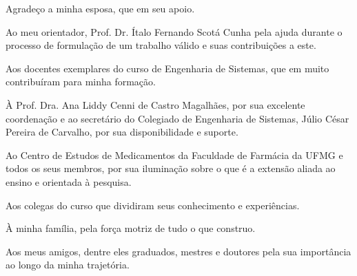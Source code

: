 
\begin{agradecimentos}


Agradeço a minha esposa, que em seu apoio.

Ao meu orientador, Prof. Dr. Ítalo Fernando Scotá Cunha pela ajuda durante o processo de formulação de um trabalho válido e suas contribuições a este.

Aos docentes exemplares do curso de Engenharia de Sistemas, que em muito contribuíram para minha formação.

À Prof. Dra. Ana Liddy Cenni de Castro Magalhães, por sua excelente coordenação e ao secretário do Colegiado de Engenharia de Sistemas, Júlio César Pereira de Carvalho, por sua disponibilidade e suporte.

Ao Centro de Estudos de Medicamentos da Faculdade de Farmácia da UFMG e todos os seus membros, por sua iluminação sobre o que é a extensão aliada ao ensino e orientada à pesquisa.

Aos colegas do curso que dividiram seus conhecimento e experiências.

À minha família, pela força motriz de tudo o que construo.

Aos meus amigos, dentre eles graduados, mestres e doutores pela sua importância ao longo da minha trajetória.

\end{agradecimentos}
